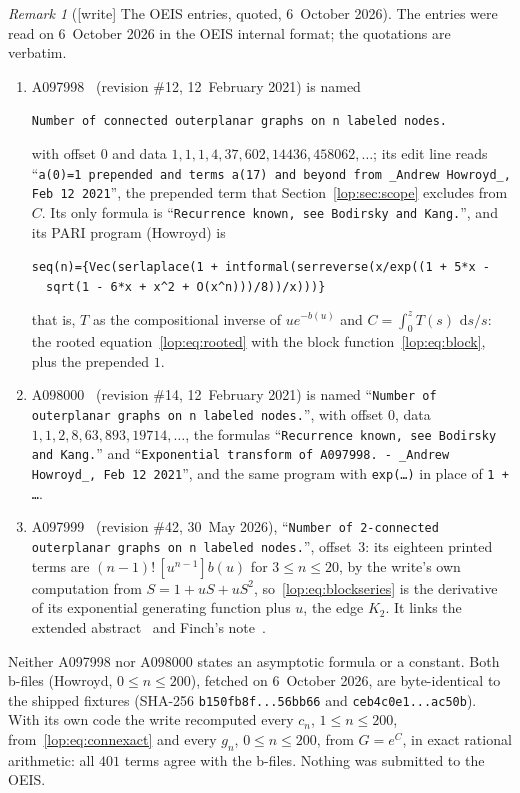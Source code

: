 \documentclass[11pt,letterpaper]{article}
\numberwithin{equation}{section}
\theoremstyle{remark}\newtheorem{remark}[theorem]{Remark}
\newcommand{\dd}{\,\mathrm d}
\newcommand{\file}[1]{\nolinkurl{#1}}
\begin{document}
\begin{remark}[{[write]} The OEIS entries, quoted, 6~October 2026]\label{lop:rem:oeis}
The entries were read on 6~October 2026 in the OEIS internal format; the
quotations are verbatim.
\begin{enumerate}[label=(\alph*)]\raggedright
\item A097998~\cite{oeisconn} (revision \#12, 12~February 2021) is named
 \begin{center}\small
 \parbox{0.92\textwidth}{\raggedright\texttt{Number of connected outerplanar graphs on n labeled nodes.}}
 \end{center}
 with offset $0$ and data $1, 1, 1, 4, 37, 602, 14436, 458062, \dots$;
 its edit line reads ``\texttt{a(0)=1 prepended and terms a(17) and beyond
 from \_Andrew Howroyd\_, Feb 12 2021}'', the prepended term that
 Section~\ref{lop:sec:scope} excludes from $C$. Its only formula is
 ``\texttt{Recurrence known, see Bodirsky and Kang.}'', and its PARI program
 (Howroyd) is
 \begin{center}\small
 \parbox{0.92\textwidth}{\raggedright\texttt{seq(n)=\{Vec(serlaplace(1 + intformal(serreverse(x/exp((1 + 5*x -}\\\texttt{\ \ sqrt(1 - 6*x + x\^{}2 + O(x\^{}n)))/8))/x)))\}}}
 \end{center}
 that is, $T$ as the compositional inverse of $ue^{-b(u)}$ and
 $C=\int_0^z T(s)\,\dd s/s$: the rooted equation~\eqref{lop:eq:rooted} with
 the block function~\eqref{lop:eq:block}, plus the prepended $1$.
\item A098000~\cite{oeisall} (revision \#14, 12~February 2021) is named
 ``\texttt{Number of outerplanar graphs on n labeled nodes.}'', with offset
 $0$, data $1, 1, 2, 8, 63, 893, 19714, \dots$, the formulas
 ``\texttt{Recurrence known, see Bodirsky and Kang.}'' and
 ``\texttt{Exponential transform of A097998. - \_Andrew Howroyd\_, Feb 12
 2021}'', and the same program with \texttt{exp(\dots)} in place of
 \texttt{1 + \dots}.
\item A097999~\cite{oeisblocks} (revision \#42, 30~May 2026), ``\texttt{Number
 of 2-connected outerplanar graphs on n labeled nodes.}'', offset~$3$: its
 eighteen printed terms are $(n-1)!\,[u^{n-1}]b(u)$ for $3\le n\le20$, by the
 write's own computation from $S=1+uS+uS^2$, so~\eqref{lop:eq:blockseries} is
 the derivative of its exponential generating function plus $u$, the edge
 $K_2$.
 It links the extended abstract~\cite{eurocomb} and Finch's
 note~\cite{finch}.
\end{enumerate}
Neither A097998 nor A098000 states an asymptotic formula or a constant.
Both b-files (Howroyd, $0\le n\le200$), fetched on 6~October 2026, are
byte-identical to the shipped fixtures (SHA-256 \file{b150fb8f...56bb66} and
\file{ceb4c0e1...ac50b}). With its own code the write recomputed every
$c_n$, $1\le n\le200$, from~\eqref{lop:eq:connexact} and every $g_n$,
$0\le n\le200$, from $G=e^C$, in exact rational arithmetic: all $401$ terms
agree with the b-files. Nothing was submitted to the OEIS.
\end{remark}
\end{document}
